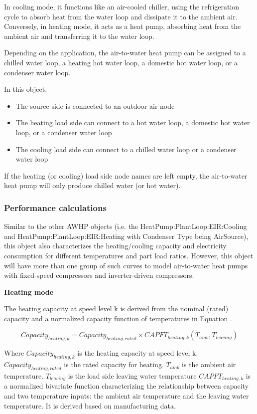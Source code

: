 In cooling mode, it functions like an air-cooled chiller, using the
refrigeration cycle to absorb heat from the water loop and dissipate it to the
ambient air. Conversely, in heating mode, it acts as a heat pump, absorbing heat
from the ambient air and transferring it to the water loop.

Depending on the application, the air-to-water heat pump can be assigned to a
chilled water loop, a heating hot water loop, a domestic hot water loop, or a
condenser water loop.

In this object:
\begin{itemize}
\item The source side is connected to an outdoor air node
\item The heating load side can connect to a hot water loop, a domestic hot water loop, or a condenser water loop
\item The cooling load side can connect to a chilled water loop or a condenser water loop
\end{itemize}

If the heating (or cooling) load side node names are left empty, the
air-to-water heat pump will only produce chilled water (or hot water).

\subsubsection{Performance calculations}

Similar to the other AWHP objects (i.e. the HeatPump:PlantLoop:EIR:Cooling and
HeatPump:PlantLoop:EIR:Heating with Condenser Type being AirSource), this object
also characterizes the heating/cooling capacity and electricity consumption for
different temperatures and part load ratios. However, this object will have more
than one group of such curves to model air-to-water heat pumps with fixed-speed
compressors and inverter-driven compressors.

\noindent\textbf{Heating mode}

The heating capacity at speed level k is derived from the nominal (rated)
capacity and a normalized capacity function of temperatures in Equation .

\begin{equation}
Capacity_{heating,k}=Capacity_{heating,rated} \times CAPFT_{heating,k}(T_{amb},T_{leaving})
\end{equation}

Where $Capacity_{heating,k}$ is the heating capacity at speed level k.
$Capacity_{heating,rated}$ is the rated capacity for heating. $T_{amb}$ is the ambient air
temperature. $T_{leaving}$ is the load side leaving water temperature $CAPFT_{heating,k}$
is a normalized bivariate function characterizing the relationship between
capacity and two temperature inputs: the ambient air temperature and the leaving
water temperature. It is derived based on manufacturing data.

